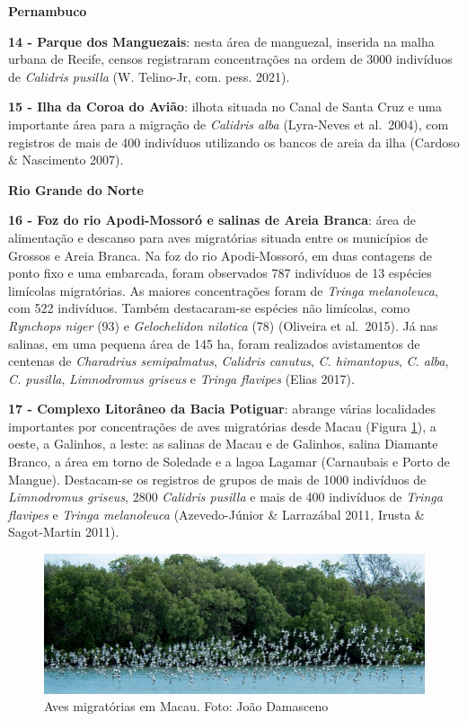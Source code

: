 \documentclass[
  oneside]{scrbook}
\begin{document}
\textbf{Pernambuco}

\textbf{14 - Parque dos Manguezais}: nesta área de manguezal, inserida na malha urbana de Recife, censos registraram concentrações na ordem de 3000 indivíduos de \emph{Calidris pusilla} (W. Telino-Jr, com. pess. 2021).

\textbf{15 - Ilha da Coroa do Avião}: ilhota situada no Canal de Santa Cruz e uma importante área para a migração de \emph{Calidris alba} (Lyra-Neves et al.~2004), com registros de mais de 400 indivíduos utilizando os bancos de areia da ilha (Cardoso \& Nascimento 2007).

\textbf{Rio Grande do Norte}

\textbf{16 - Foz do rio Apodi-Mossoró e salinas de Areia Branca}: área de alimentação e descanso para aves migratórias situada entre os municípios de Grossos e Areia Branca. Na foz do rio Apodi-Mossoró, em duas contagens de ponto fixo e uma embarcada, foram observados 787 indivíduos de 13 espécies limícolas migratórias. As maiores concentrações foram de \emph{Tringa melanoleuca}, com 522 indivíduos. Também destacaram-se espécies não limícolas, como \emph{Rynchops niger} (93) e \emph{Gelochelidon nilotica} (78) (Oliveira et al.~2015). Já nas salinas, em uma pequena área de 145 ha, foram realizados avistamentos de centenas de \emph{Charadrius semipalmatus}, \emph{Calidris canutus}, \emph{C. himantopus}, \emph{C. alba}, \emph{C. pusilla}, \emph{Limnodromus griseus} e \emph{Tringa flavipes} (Elias 2017).

\textbf{17 - Complexo Litorâneo da Bacia Potiguar}: abrange várias localidades importantes por concentrações de aves migratórias desde Macau (Figura \ref{fig:23}), a oeste, a Galinhos, a leste: as salinas de Macau e de Galinhos, salina Diamante Branco, a área em torno de Soledade e a lagoa Lagamar (Carnaubais e Porto de Mangue). Destacam-se os registros de grupos de mais de 1000 indivíduos de \emph{Limnodromus griseus}, 2800 \emph{Calidris pusilla} e mais de 400 indivíduos de \emph{Tringa flavipes} e \emph{Tringa melanoleuca} (Azevedo-Júnior \& Larrazábal 2011, Irusta \& Sagot-Martin 2011).

\begin{figure}[H]

{\centering \includegraphics[width=0.75\linewidth]{imagens/cap07/Figura_7.3} 

}

\caption{Aves migratórias em Macau. Foto: João Damasceno}\label{fig:23}
\end{figure}
\end{document}
